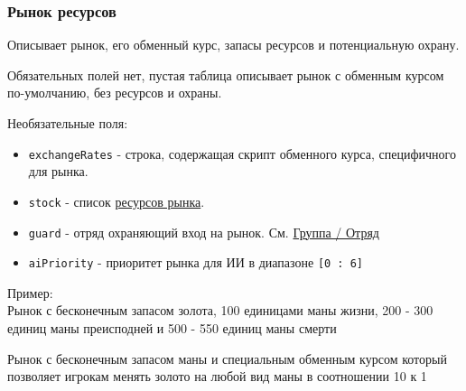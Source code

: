 \subsubsection{Рынок ресурсов}
\label{resourcemarket}
Описывает рынок, его обменный курс, запасы ресурсов и потенциальную охрану.

Обязательных полей нет, пустая таблица описывает рынок с обменным курсом по-умолчанию, без ресурсов и охраны.

Необязательные поля:
\begin{itemize}
\item \texttt{exchangeRates} - строка, содержащая скрипт обменного курса, специфичного для рынка.
\item \texttt{stock} - список \hyperref[marketresource]{ресурсов рынка}.
\item \texttt{guard} - отряд охраняющий вход на рынок. См. \hyperref[group]{Группа / Отряд}
\item \texttt{aiPriority} - приоритет рынка для ИИ в диапазоне \texttt{[0 : 6]}
\end{itemize}

Пример:\\
Рынок с бесконечным запасом золота, 100 единицами маны жизни, 200 - 300 единиц маны преисподней и 500 - 550 единиц маны смерти

\begin{figure}[H]

\end{figure}

Рынок с бесконечным запасом маны и специальным обменным курсом который позволяет игрокам менять золото на любой вид маны в соотношении 10 к 1

\begin{figure}[H]

\end{figure}